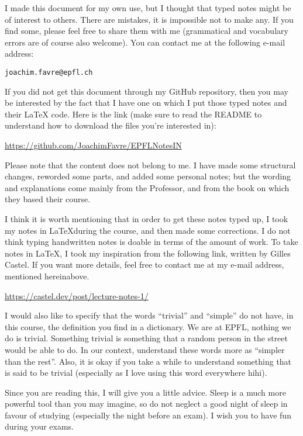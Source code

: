 I made this document for my own use, but I thought that typed notes might be of interest to others. There are mistakes, it is impossible not to make any. If you find some, please feel free to share them with me (grammatical and vocabulary errors are of course also welcome). You can contact me at the following e-mail address:
\begin{center}
    \texttt{joachim.favre@epfl.ch}
\end{center}

If you did not get this document through my GitHub repository, then you may be interested by the fact that I have one on which I put those typed notes and their LaTeX code. Here is the link (make sure to read the README to understand how to download the files you're interested in):
\begin{center}
    \url{https://github.com/JoachimFavre/EPFLNotesIN}
\end{center}

Please note that the content does not belong to me. I have made some structural changes, reworded some parts, and added some personal notes; but the wording and explanations come mainly from the Professor, and from the book on which they based their course.

I think it is worth mentioning that in order to get these notes typed up, I took my notes in \LaTeX during the course, and then made some corrections. I do not think typing handwritten notes is doable in terms of the amount of work. To take notes in \LaTeX, I took my inspiration from the following link, written by Gilles Castel. If you want more details, feel free to contact me at my e-mail address, mentioned hereinabove.
\begin{center}
    \url{https://castel.dev/post/lecture-notes-1/}
\end{center}

I would also like to specify that the words ``trivial'' and ``simple'' do not have, in this course, the definition you find in a dictionary. We are at EPFL, nothing we do is trivial. Something trivial is something that a random person in the street would be able to do. In our context, understand these words more as ``simpler than the rest''. Also, it is okay if you take a while to understand something that is said to be trivial (especially as I love using this word everywhere hihi).

Since you are reading this, I will give you a little advice. Sleep is a much more powerful tool than you may imagine, so do not neglect a good night of sleep in favour of studying (especially the night before an exam). I wish you to have fun during your exams.
